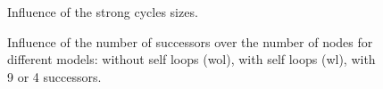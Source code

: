 \begin{figure}
\centering
\begin{minipage}[t]{0.49\linewidth}
	
	\caption{Influence of the strong cycles sizes.}
	\label{fig:cycle_sizes}
\end{minipage}
\begin{minipage}[t]{0.49\linewidth}
	
	\caption{Influence of the number of successors over the number of nodes for different models: without self loops (wol), with self loops (wl), with 9 or 4 successors.}
	\label{fig:max_cycle_tree}
\end{minipage}
\end{figure}

